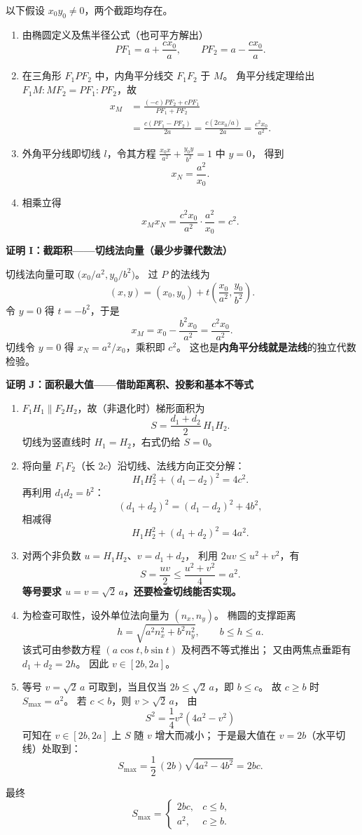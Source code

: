 \begin{proofbox}
以下假设 $x_0y_0\ne0$，两个截距均存在。
\begin{enumerate}
\item 由椭圆定义及焦半径公式（也可平方解出）
\[
PF_1=a+\frac{cx_0}{a},\qquad
PF_2=a-\frac{cx_0}{a}.
\]
\item 在三角形 $F_1PF_2$ 中，内角平分线交 $F_1F_2$ 于 $M$。
角平分线定理给出
$F_1M:MF_2=PF_1:PF_2$，故
\[
\begin{aligned}
x_M
&=\frac{(-c)PF_2+cPF_1}{PF_1+PF_2}\\
&=\frac{c(PF_1-PF_2)}{2a}
=\frac{c(2cx_0/a)}{2a}
=\frac{c^2x_0}{a^2}.
\end{aligned}
\]
\item 外角平分线即切线 $l$，令其方程
$\frac{x_0x}{a^2}+\frac{y_0y}{b^2}=1$ 中 $y=0$，
得到
\[
x_N=\frac{a^2}{x_0}.
\]
\item 相乘立得
\[
\boxed{x_Mx_N=\frac{c^2x_0}{a^2}\cdot\frac{a^2}{x_0}=c^2}.
\]
\end{enumerate}

\textbf{证明 I：截距积——切线法向量（最少步骤代数法）}

切线法向量可取 $\bigl(x_0/a^2,y_0/b^2\bigr)$。
过 $P$ 的法线为
\[
(x,y)=(x_0,y_0)+t\left(\frac{x_0}{a^2},\frac{y_0}{b^2}\right).
\]
令 $y=0$ 得 $t=-b^2$，于是
\[
x_M=x_0-\frac{b^2x_0}{a^2}=\frac{c^2x_0}{a^2}.
\]
切线令 $y=0$ 得 $x_N=a^2/x_0$，乘积即 $c^2$。
这也是\textbf{内角平分线就是法线}的独立代数检验。

\medskip
\textbf{证明 J：面积最大值——借助距离积、投影和基本不等式}
\begin{enumerate}
\item $F_1H_1\parallel F_2H_2$，故（非退化时）梯形面积为
\[
S=\frac{d_1+d_2}{2}\,H_1H_2.
\]
切线为竖直线时 $H_1=H_2$，右式仍给 $S=0$。
\item 将向量 $F_1F_2$（长 $2c$）沿切线、法线方向正交分解：
\[
H_1H_2^2+(d_1-d_2)^2=4c^2.
\]
再利用 $d_1d_2=b^2$：
\[
(d_1+d_2)^2=(d_1-d_2)^2+4b^2,
\]
相减得
\[
\boxed{H_1H_2^2+(d_1+d_2)^2=4a^2}.
\]
\item 对两个非负数 $u=H_1H_2$、$v=d_1+d_2$，
利用 $2uv\le u^2+v^2$，有
\[
S=\frac{uv}{2}\le\frac{u^2+v^2}{4}=a^2.
\]
\textbf{等号要求 $u=v=\sqrt2\,a$，还要检查切线能否实现。}
\item 为检查可取性，设外单位法向量为 $(n_x,n_y)$。
椭圆的支撑距离
\[
h=\sqrt{a^2n_x^2+b^2n_y^2},\qquad b\le h\le a.
\]
该式可由参数方程 $(a\cos t,b\sin t)$ 及柯西不等式推出；
又由两焦点垂距有 $d_1+d_2=2h$。
因此 $v\in[2b,2a]$。
\item 等号 $v=\sqrt2\,a$ 可取到，当且仅当
$2b\le\sqrt2\,a$，即 $b\le c$。
故 $c\ge b$ 时 $S_{\max}=a^2$。
若 $c<b$，则 $v>\sqrt2\,a$，
由
\[
S^2=\frac14v^2(4a^2-v^2)
\]
可知在 $v\in[2b,2a]$ 上 $S$ 随 $v$ 增大而减小；
于是最大值在 $v=2b$（水平切线）处取到：
\[
S_{\max}=\frac12\,(2b)\sqrt{4a^2-4b^2}=2bc.
\]
\end{enumerate}
最终
\[
\boxed{S_{\max}=\begin{cases}2bc,&c\le b,\\a^2,&c\ge b.\end{cases}}
\]


\end{proofbox}
